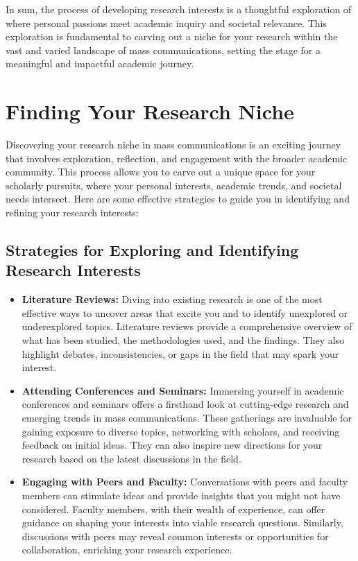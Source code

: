 \documentclass[
]{book}
\begin{document}
In sum, the process of developing research interests is a thoughtful exploration of where personal passions meet academic inquiry and societal relevance. This exploration is fundamental to carving out a niche for your research within the vast and varied landscape of mass communications, setting the stage for a meaningful and impactful academic journey.

\hypertarget{finding-your-research-niche}{%
\section{Finding Your Research Niche}\label{finding-your-research-niche}}

Discovering your research niche in mass communications is an exciting journey that involves exploration, reflection, and engagement with the broader academic community. This process allows you to carve out a unique space for your scholarly pursuits, where your personal interests, academic trends, and societal needs intersect. Here are some effective strategies to guide you in identifying and refining your research interests:

\hypertarget{strategies-for-exploring-and-identifying-research-interests}{%
\subsection*{Strategies for Exploring and Identifying Research Interests}\label{strategies-for-exploring-and-identifying-research-interests}}

\begin{itemize}
\item
  \textbf{Literature Reviews:} Diving into existing research is one of the most effective ways to uncover areas that excite you and to identify unexplored or underexplored topics. Literature reviews provide a comprehensive overview of what has been studied, the methodologies used, and the findings. They also highlight debates, inconsistencies, or gaps in the field that may spark your interest.
\item
  \textbf{Attending Conferences and Seminars:} Immersing yourself in academic conferences and seminars offers a firsthand look at cutting-edge research and emerging trends in mass communications. These gatherings are invaluable for gaining exposure to diverse topics, networking with scholars, and receiving feedback on initial ideas. They can also inspire new directions for your research based on the latest discussions in the field.
\item
  \textbf{Engaging with Peers and Faculty:} Conversations with peers and faculty members can stimulate ideas and provide insights that you might not have considered. Faculty members, with their wealth of experience, can offer guidance on shaping your interests into viable research questions. Similarly, discussions with peers may reveal common interests or opportunities for collaboration, enriching your research experience.
\end{itemize}
\end{document}

